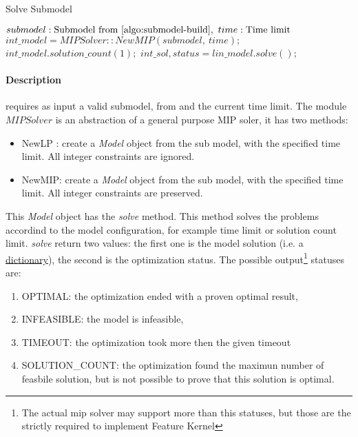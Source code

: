 \begin{algorithm}[H]
    \caption{Solve Submodel}\label{algo:solve-submodel}
    \begin{algorithmic}[1]
        \REQUIRE $submodel: \text{Submodel from \Cref{algo:submodel-build}},\ time: \text{Time limit}$
            \STATE $int\_model = MIPSolver::NewMIP(submodel,\ time);$
            \STATE $int\_model.solution\_count(1);$
            \STATE $int\_sol, status = lin\_model.solve();$
            \ELSE 
            \ENDIF
        \ELSE
        \ENDIF
    \end{algorithmic}
\end{algorithm}

\paragraph{Description}  requires as input a valid submodel, from  and the current time limit. The module $MIPSolver$
is an abstraction of a general purpose MIP soler, it has two methods:
\begin{itemize}
    \item NewLP : create a \emph{Model} object from the sub model, with the specified time limit. All integer constraints are ignored.
    \item NewMIP: create a \emph{Model} object from the sub model, with the specified time limit. All integer constraints are preserved.
\end{itemize}

This \emph{Model} object has the \emph{solve} method. This method solves the problems accordind to the model configuration, for example time limit or solution count limit. 
\emph{solve} return two values: the first one is the model solution (i.e. a \href{https://en.wikipedia.org/wiki/Associative_array}{dictionary}), 
the second is the optimization
status. The possible output\footnote{The actual mip solver may support more than this statuses, but those are the strictly required to implement Feature Kernel } statuses are: 
\begin{enumerate}
    \item OPTIMAL: the optimization ended with a proven optimal result,
    \item INFEASIBLE: the model is infeasible,
    \item TIMEOUT: the optimization took more then the given timeout
    \item SOLUTION\_COUNT: the optimization found the maximun number of feasbile solution, but is not possible to prove that this solution is optimal.
\end{enumerate}

